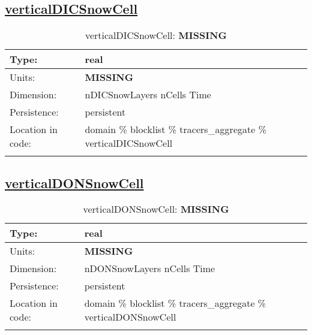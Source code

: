 \subsection[verticalDICSnowCell]{\hyperref[sec:var_tab_tracers_aggregate]{verticalDICSnowCell}}
\label{subsec:var_sec_tracers_aggregate_verticalDICSnowCell}
\begin{center}
\begin{longtable}{| p{2.0in} | p{4.0in} |}
        \hline 
        Type: & real \\
        \hline 
        Units: & {\bf \color{red} MISSING} \\
        \hline 
        Dimension: & nDICSnowLayers nCells Time \\
        \hline 
        Persistence: & persistent \\
        \hline 
         Location in code: & domain \% blocklist \% tracers\_aggregate \% verticalDICSnowCell \\
         \hline 
    \caption{verticalDICSnowCell: {\bf \color{red} MISSING}}
\end{longtable}
\end{center}
\subsection[verticalDONSnowCell]{\hyperref[sec:var_tab_tracers_aggregate]{verticalDONSnowCell}}
\label{subsec:var_sec_tracers_aggregate_verticalDONSnowCell}
\begin{center}
\begin{longtable}{| p{2.0in} | p{4.0in} |}
        \hline 
        Type: & real \\
        \hline 
        Units: & {\bf \color{red} MISSING} \\
        \hline 
        Dimension: & nDONSnowLayers nCells Time \\
        \hline 
        Persistence: & persistent \\
        \hline 
         Location in code: & domain \% blocklist \% tracers\_aggregate \% verticalDONSnowCell \\
         \hline 
    \caption{verticalDONSnowCell: {\bf \color{red} MISSING}}
\end{longtable}
\end{center}
